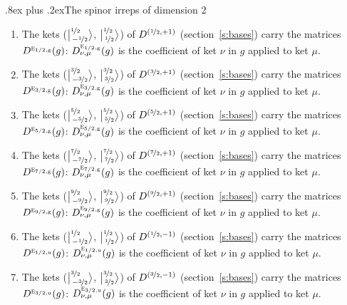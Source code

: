 \documentclass[10pt,a4paper]{article}
\makeatletter
\renewcommand\subsection{\@startsection{subsection}{2}{\z@}{-2.5ex plus -1ex minus -.2ex}%
  {.8ex plus .2ex}{\normalfont\sffamily\bfseries\color{parttitle}}}
\numberwithin{equation}{section}
\newcommand{\irr}[1]{\text{\normalfont\scshape #1}}
\newcommand{\ptag}[1]{\mathrm{#1}}
\newcommand{\irrJp}[2]{D^{(#1,#2)}}
\newcommand{\repD}[1]{D^{#1}}
\newcommand{\intx}{\mu}
\newcommand{\jm}[2]{\bigl\lvert{}^{#1}_{\,#2}\bigr\rangle}
\newenvironment{romanlist}{\begin{enumerate}%
\renewcommand{\labelenumi}{(\roman{enumi})}}%
  {\end{enumerate}}
\makeatother
\begin{document}
\subsection{The spinor irreps of dimension 2}
\begin{romanlist}\raggedright
\item The kets ($\jm{\nicefrac{1}{2}}{-\nicefrac{1}{2}}$, $\jm{\nicefrac{1}{2}}{\nicefrac{1}{2}}$) of $\irrJp{\nicefrac{1}{2}}{+1}$ (section~\ref{s:bases}) carry the matrices $\repD{\irr{e}_{1/2,\ptag{g}}}(g)$: $\repD{\irr{e}_{1/2,\ptag{g}}}_{\nu,\intx}(g)$ is the coefficient of ket $\nu$ in $g$ applied to ket $\intx$.
\item The kets ($\jm{\nicefrac{3}{2}}{-\nicefrac{3}{2}}$, $\jm{\nicefrac{3}{2}}{\nicefrac{3}{2}}$) of $\irrJp{\nicefrac{3}{2}}{+1}$ (section~\ref{s:bases}) carry the matrices $\repD{\irr{e}_{3/2,\ptag{g}}}(g)$: $\repD{\irr{e}_{3/2,\ptag{g}}}_{\nu,\intx}(g)$ is the coefficient of ket $\nu$ in $g$ applied to ket $\intx$.
\item The kets ($\jm{\nicefrac{5}{2}}{-\nicefrac{5}{2}}$, $\jm{\nicefrac{5}{2}}{\nicefrac{5}{2}}$) of $\irrJp{\nicefrac{5}{2}}{+1}$ (section~\ref{s:bases}) carry the matrices $\repD{\irr{e}_{5/2,\ptag{g}}}(g)$: $\repD{\irr{e}_{5/2,\ptag{g}}}_{\nu,\intx}(g)$ is the coefficient of ket $\nu$ in $g$ applied to ket $\intx$.
\item The kets ($\jm{\nicefrac{7}{2}}{-\nicefrac{7}{2}}$, $\jm{\nicefrac{7}{2}}{\nicefrac{7}{2}}$) of $\irrJp{\nicefrac{7}{2}}{+1}$ (section~\ref{s:bases}) carry the matrices $\repD{\irr{e}_{7/2,\ptag{g}}}(g)$: $\repD{\irr{e}_{7/2,\ptag{g}}}_{\nu,\intx}(g)$ is the coefficient of ket $\nu$ in $g$ applied to ket $\intx$.
\item The kets ($\jm{\nicefrac{9}{2}}{-\nicefrac{9}{2}}$, $\jm{\nicefrac{9}{2}}{\nicefrac{9}{2}}$) of $\irrJp{\nicefrac{9}{2}}{+1}$ (section~\ref{s:bases}) carry the matrices $\repD{\irr{e}_{9/2,\ptag{g}}}(g)$: $\repD{\irr{e}_{9/2,\ptag{g}}}_{\nu,\intx}(g)$ is the coefficient of ket $\nu$ in $g$ applied to ket $\intx$.
\item The kets ($\jm{\nicefrac{1}{2}}{-\nicefrac{1}{2}}$, $\jm{\nicefrac{1}{2}}{\nicefrac{1}{2}}$) of $\irrJp{\nicefrac{1}{2}}{-1}$ (section~\ref{s:bases}) carry the matrices $\repD{\irr{e}_{1/2,\ptag{u}}}(g)$: $\repD{\irr{e}_{1/2,\ptag{u}}}_{\nu,\intx}(g)$ is the coefficient of ket $\nu$ in $g$ applied to ket $\intx$.
\item The kets ($\jm{\nicefrac{3}{2}}{-\nicefrac{3}{2}}$, $\jm{\nicefrac{3}{2}}{\nicefrac{3}{2}}$) of $\irrJp{\nicefrac{3}{2}}{-1}$ (section~\ref{s:bases}) carry the matrices $\repD{\irr{e}_{3/2,\ptag{u}}}(g)$: $\repD{\irr{e}_{3/2,\ptag{u}}}_{\nu,\intx}(g)$ is the coefficient of ket $\nu$ in $g$ applied to ket $\intx$.

\end{romanlist}
\end{document}
